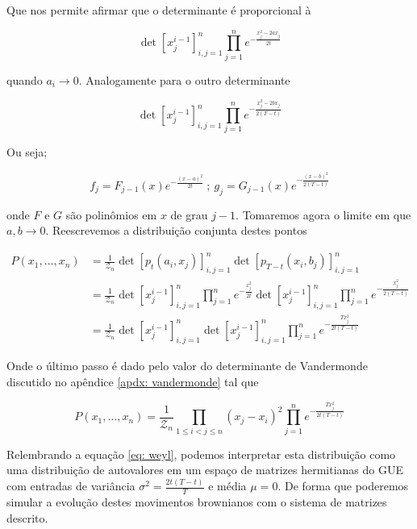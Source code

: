 Que nos permite afirmar que o determinante é proporcional à

\[
	\det{[x_{j}^{i-1}]}^{n}_{i,j=1} \prod_{j=1}^{n} e^{-\frac{x_j^2 - 2ax_j}{2t}}
\]

quando $a_i \rightarrow 0$. Analogamente para o outro determinante

\[
	\det{[x_{j}^{i-1}]}^{n}_{i,j=1} \prod_{j=1}^{n} e^{-\frac{x_j^2 - 2bx_j}{2(T-t)}}
\]

Ou seja;

\[
	f_j = F_{j-1}(x)e^{-\frac{(x-a)^2}{2t}} \ ; \ g_j = G_{j-1}(x)e^{-\frac{(x-b)^2}{2(T-t)}}
\]

onde $F$ e $G$ são polinômios em $x$  de grau $j-1$. Tomaremos agora o limite em que $a,b \rightarrow 0$. Reescrevemos a distribuição conjunta destes pontos

\begin{align}
	P(x_1, \dots, x_n)
	& = \frac{1}{\mathcal{Z}_n} \det{[p_t(a_i, x_j)]^{n}_{i,j=1}} \det{[p_{T-t}(x_i, b_j)]^{n}_{i,j=1}} \\
	& = \frac{1}{\mathcal{Z}_n} \det{[x_{j}^{i-1}]}^{n}_{i,j=1} \prod_{j=1}^{n} e^{-\frac{x_j^2}{2t}} \det{[x_{j}^{i-1}]}^{n}_{i,j=1} \prod_{j=1}^{n} e^{-\frac{x_j^2}{2(T-t)}} \\
	& =\frac{1}{\mathcal{Z}_n} \det{[x_{j}^{i-1}]}^{n}_{i,j=1} \det{[x_{j}^{i-1}]}^{n}_{i,j=1} \prod_{j=1}^{n} e^{-\frac{T x_j^2}{2t(T-t)}}
\end{align}

Onde o último passo é dado pelo valor do determinante de Vandermonde discutido no apêndice \ref{apdx: vandermonde} tal que

\[
	P(x_1, \dots, x_n)=\frac{1}{\mathcal{Z}_n} \prod_{1\leq i < j \leq n} (x_j - x_i)^2 \prod_{j=1}^{n} e^{-\frac{T x_j^2}{2t(T-t)}}
\] 

Relembrando a equação \eqref{eq: weyl}, podemos interpretar esta distribuição como uma distribuição de autovalores em um espaço de matrizes hermitianas do GUE com entradas de variância $\sigma^2 = \frac{2t(T-t)}{T}$ e média $\mu = 0$. De forma que poderemos simular a evolução destes movimentos brownianos com o sistema de matrizes descrito.

\begin{center}
\end{center} 

